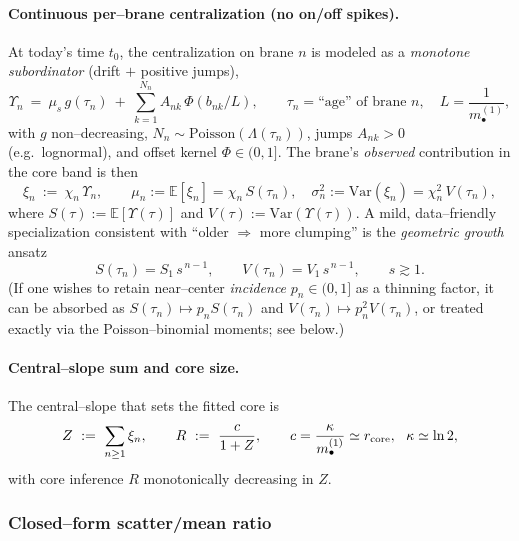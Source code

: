 \documentclass[10pt]{article}
\theoremstyle{definition}
\theoremstyle{plain}
\begin{document}
\paragraph{Continuous per–brane centralization (no on/off spikes).}\label{par:uom-main-184}
At today’s time $t_0$, the centralization on brane $n$ is modeled as a \emph{monotone subordinator} (drift $+$ positive jumps),
\begin{equation}
\Upsilon_n\ =\ \mu_s\,g(\tau_n)\ +\ \sum_{k=1}^{N_n} A_{nk}\,\Phi(b_{nk}/L),\qquad 
\tau_n=\text{``age'' of brane }n,\quad L=\frac{1}{m_\bullet^{(1)}},
\label{eq:upsilon}
\end{equation}
with $g$ non–decreasing, $N_n\sim\mathrm{Poisson}(\Lambda(\tau_n))$, jumps $A_{nk}>0$ (e.g.\ lognormal), and offset kernel $\Phi\in(0,1]$. The brane’s \emph{observed} contribution in the core band is then
\begin{equation}
\xi_n\ :=\ \chi_n\,\Upsilon_n,
\qquad 
\mu_n:=\mathbb E[\xi_n]=\chi_n\,S(\tau_n),\quad
\sigma_n^2:=\mathrm{Var}(\xi_n)=\chi_n^2\,V(\tau_n),
\label{eq:xi-mom}
\end{equation}
where $S(\tau):=\mathbb E[\Upsilon(\tau)]$ and $V(\tau):=\mathrm{Var}(\Upsilon(\tau))$. A mild, data–friendly specialization consistent with ``older $\Rightarrow$ more clumping'' is the \emph{geometric growth} ansatz
\begin{equation}
S(\tau_n)=S_1\,s^{\,n-1},\qquad V(\tau_n)=V_1\,s^{\,n-1},\qquad s\gtrsim 1.
\label{eq:geo-age}
\end{equation}
(If one wishes to retain near–center \emph{incidence} $p_n\in(0,1]$ as a thinning factor, it can be absorbed as $S(\tau_n)\mapsto p_n S(\tau_n)$ and $V(\tau_n)\mapsto p_n^2 V(\tau_n)$, or treated exactly via the Poisson–binomial moments; see below.)

\paragraph{Central–slope sum and core size.}\label{par:uom-main-185}
The central–slope that sets the fitted core is
\begin{equation}
Z\ :=\ \sum_{n\ge 1}\xi_n,\qquad R\ :=\ \frac{c}{1+Z},\qquad c=\frac{\kappa}{m_\bullet^{(1)}}\simeq r_{\rm core},\ \ \kappa\simeq\ln 2,
\label{eq:sum-R}
\end{equation}
with core inference $R$ monotonically decreasing in $Z$.

\subsubsection*{Closed–form scatter/mean ratio}
\label{subsubsec:sdmean}
\end{document}
